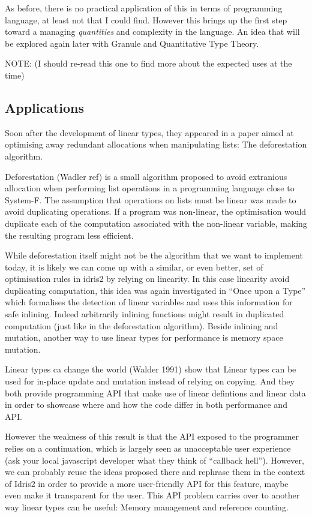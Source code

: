 \documentclass[
]{article}
\begin{document}
As before, there is no practical application of this in terms of
programming language, at least not that I could find. However this
brings up the first step toward a managing \emph{quantities} and
complexity in the language. An idea that will be explored again later
with Granule and Quantitative Type Theory.

NOTE: (I should re-read this one to find more about the expected uses at
the time)

\hypertarget{applications}{%
\subsection{Applications}\label{applications}}

Soon after the development of linear types, they appeared in a paper
aimed at optimising away redundant allocations when manipulating lists:
The deforestation algorithm.

Deforestation (Wadler ref) is a small algorithm proposed to avoid
extranious allocation when performing list operations in a programming
language close to System-F. The assumption that operations on lists must
be linear was made to avoid duplicating operations. If a program was
non-linear, the optimisation would duplicate each of the computation
associated with the non-linear variable, making the resulting program
less efficient.

While deforestation itself might not be the algorithm that we want to
implement today, it is likely we can come up with a similar, or even
better, set of optimisation rules in idris2 by relying on linearity. In
this case linearity avoid duplicating computation, this idea was again
investigated in ``Once upon a Type'' which formalises the detection of
linear variables and uses this information for safe inlining. Indeed
arbitrarily inlining functions might result in duplicated computation
(just like in the deforestation algorithm). Beside inlining and
mutation, another way to use linear types for performance is memory
space mutation.

Linear types ca change the world (Walder 1991) show that Linear types
can be used for in-place update and mutation instead of relying on
copying. And they both provide programming API that make use of linear
defintions and linear data in order to showcase where and how the code
differ in both performance and API.

However the weakness of this result is that the API exposed to the
programmer relies on a continuation, which is largely seen as
unacceptable user experience (ask your local javascript developer what
they think of ``callback hell''). However, we can probably reuse the
ideas proposed there and rephrase them in the context of Idris2 in order
to provide a more user-friendly API for this feature, maybe even make it
transparent for the user. This API problem carries over to another way
linear types can be useful: Memory management and reference counting.
\end{document}
